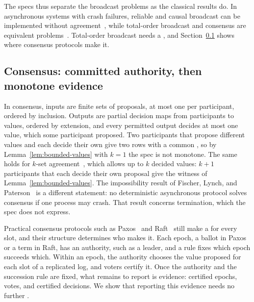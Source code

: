 The specs thus separate the broadcast problems as the classical results do.
In asynchronous systems with crash failures, reliable and causal broadcast can
be implemented without agreement~\cite{hadzilacos1994modular}, while
total-order broadcast and consensus are equivalent
problems~\cite{chandra1996unreliable}.  Total-order broadcast needs a
\commitment, and Section~\ref{app:consensus} shows where consensus protocols
make it.

\subsection{Consensus: committed authority, then monotone evidence}
\label{app:consensus}

In consensus, inputs are finite sets of proposals, at most one per
participant, ordered by inclusion.  Outputs are partial decision maps from
participants to values, ordered by extension, and every permitted output
decides at most one value, which some participant proposed.  Two participants
that propose different values and each decide their own give two rows with a
common \indesc, so by Lemma~\ref{lem:bounded-values} with $k=1$ the spec is not
monotone.  The same holds for $k$-set agreement~\cite{chaudhuri1993more}, which
allows up to $k$ decided values: $k+1$ participants that each decide their own
proposal give the witness of Lemma~\ref{lem:bounded-values}.  The
impossibility result of Fischer, Lynch, and
Paterson~\cite{fischer1985impossibility} is a different statement: no
deterministic asynchronous protocol solves consensus if one process may crash.
That result concerns termination, which the spec does not express.

Practical consensus protocols such as Paxos~\cite{lamport2001paxos} and
Raft~\cite{ongaro2014raft} still make a \commitment for every slot, and their
structure determines who makes it.  Each epoch, a ballot in Paxos or a term in
Raft, has an authority, such as a leader, and a rule fixes which epoch succeeds
which.
Within an epoch, the authority chooses the value proposed for each slot of a
replicated log, and voters certify it.  Once the authority and the succession
rule are fixed, what remains to report is evidence: certified epochs, votes,
and certified decisions.  We show that reporting this evidence needs no
further \commitment.

